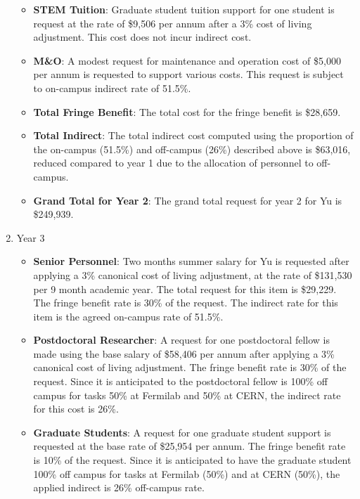 \begin{enumerate}
\begin{itemize}
\item {{\bf STEM Tuition}: Graduate student tuition support for one student is request at the rate of \$9,506 per annum after a 3\% cost of living adjustment.  This cost does not incur indirect cost.}

\item {{\bf M\&O}: A modest request for maintenance and operation cost of \$5,000 per annum is requested to support various costs.   This request is subject to on-campus indirect rate of 51.5\%.}

\item {{\bf Total Fringe Benefit}: The total cost for the fringe benefit is \$28,659.}

\item {{\bf Total Indirect}: The total indirect cost computed using the proportion of the on-campus (51.5\%) and off-campus (26\%) described above is \$63,016, reduced compared to year 1 due to the allocation of personnel to off-campus.}

\item {{\bf Grand Total for Year 2}: The grand total request for year 2 for Yu is \$249,939.}

\end{itemize}

\item{Year 3}
\begin{itemize}
\item{{\bf Senior Personnel}: Two months summer salary for Yu is requested after applying a 3\% canonical cost of living adjustment, at the rate of \$131,530 per 9 month academic year.  The total request for this item is \$29,229.   The fringe benefit rate is 30\% of the request.  The indirect rate for this item is the agreed on-campus rate of 51.5\%.}

\item {{\bf Postdoctoral Researcher}: A request for one postdoctoral fellow is made using the base salary of \$58,406 per annum after applying a 3\% canonical cost of living adjustment.  The fringe benefit rate is 30\% of the request.  Since it is anticipated to the postdoctoral fellow is 100\% off campus for tasks 50\% at Fermilab and 50\% at CERN, the indirect rate for this cost is 26\%.} 

\item{{\bf Graduate Students}: A request for one graduate student support is requested at the base rate of \$25,954 per annum.   The fringe benefit rate is 10\% of the request.  Since it is anticipated to have the graduate student 100\% off campus for tasks at Fermilab (50\%) and at CERN (50\%), the applied indirect is 26\% off-campus rate.}


\end{itemize}
\end{enumerate}
